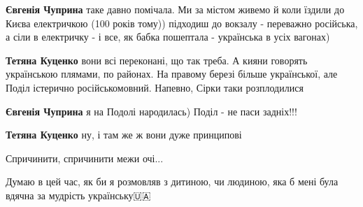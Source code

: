 \begin{itemize}
\begin{itemize}
\textbf{Євгенія Чуприна} таке давно помічала. Ми за містом живемо й коли їздили
до Києва електричкою (100 років тому)) підходиш до вокзалу - переважно
російська, а сіли в електричку - і все, як бабка пошептала - українська в усіх
вагонах)

 
\textbf{Тетяна Куценко} вони всі переконані, що так треба. А кияни говорять
українською плямами, по районах. На правому березі більше української, але
Поділ істерично російськомовний. Напевно, Сірки таки розплодилися

 
\textbf{Євгенія Чуприна} я на Подолі народилась) Поділ - не паси задніх!!!

 
\textbf{Тетяна Куценко} ну, і там же ж вони дуже принципові
\end{itemize}

 
Спричинити, спричинити межи очі...

 
Думаю в цей час, як би я розмовляв з дитиною, чи людиною, яка б мені була вдячна за мудрість українську🇺🇦

 


\end{itemize}
